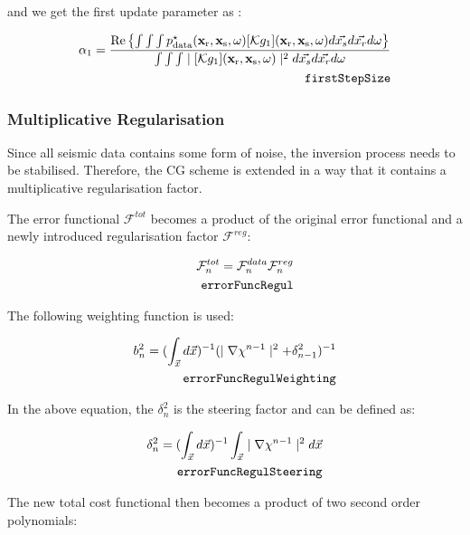 \documentclass[10pt,a4paper]{article}
\newcommand{\real}[1]{\text{Re} \left\{ #1 \right\}}
\begin{document}
and we get the first update parameter as :

\begin{align} \label{eq:firstStepSize} \alpha_1 = \frac {\real {\int \int
\int p^{\star}_\text{data}(\mathbf{x_\text{r}},\mathbf{x_\text{s}},\omega)[\mathcal{K}
g_1](\mathbf{x_\text{r}},\mathbf{x_\text{s}},\omega)d\vec{x_s}d\vec{x_r}d\omega}}{\int
\int \int \mid[\mathcal{K}
g_1](\mathbf{x_\text{r}},\mathbf{x_\text{s}},\omega) \mid^2
d\vec{x_s}d\vec{x_r}d\omega}\\
\tag*{\texttt{firstStepSize}}
\end{align}


\subsubsection{Multiplicative Regularisation}
\label{multreg}
Since all seismic data contains some form of noise, the inversion
process needs to be stabilised. Therefore, the CG scheme is extended
in a way that it contains a multiplicative regularisation factor.

The error functional $\mathcal{F}^{tot}$ becomes a product of the
original error functional and a newly introduced regularisation factor
$\mathcal{F}^{reg}$:

\begin{align} \label{eq:errorFuncRegul} \mathcal{F}^{tot}_n =
\mathcal{F}^{data}_n \mathcal{F}^{reg}_n\\
\tag*{\texttt{errorFuncRegul}}
\end{align}

The following weighting function is used:

\begin{align} \label{eq:errorFuncRegulWeighting} b_n^{2} = (\int_{\vec{x}}
d\vec{x})^{-1} (\mid\nabla\chi^{n-1}\mid^2 + \delta_{n-1}^2)^{-1}\\
\tag*{\texttt{errorFuncRegulWeighting}}
\end{align}

In the above equation, the $\delta_{n}^2$ is the steering factor and
can be defined as:

\begin{align} \label{eq:errorFuncRegulSteering} \delta_{n}^2 = (\int_{\vec{x}}
d\vec{x})^{-1} \int_{\vec{x}} \mid\nabla\chi^{n-1}\mid^2 d\vec{x}\\
\tag*{\texttt{errorFuncRegulSteering}}
\end{align}

The new total cost functional then becomes a
product of two second order
polynomials:
\end{document}
